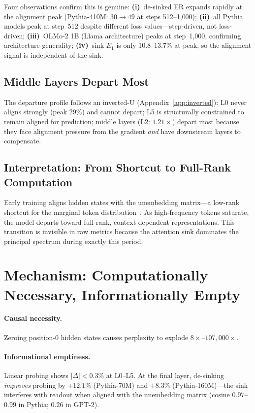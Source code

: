\documentclass[11pt]{article}
\begin{document}
Four observations confirm this is genuine:
\textbf{(i)}~de-sinked ER expands rapidly at the alignment peak (Pythia-410M: $30 \to 49$ at steps 512--1{,}000);
\textbf{(ii)}~all Pythia models peak at step~512 despite different loss values---step-driven, not loss-driven;
\textbf{(iii)}~OLMo-2 1B (Llama architecture) peaks at step~1{,}000, confirming architecture-generality;
\textbf{(iv)}~sink $E_1$ is only 10.8--13.7\% at peak, so the alignment signal is independent of the sink.

\subsection{Middle Layers Depart Most}\label{sec:inverted}

The departure profile follows an inverted-U (Appendix~\ref{app:inverted}): L0 never aligns strongly (peak 29\%) and cannot depart; L5 is structurally constrained to remain aligned for prediction; middle layers (L2: $1.21\times$) depart most because they face alignment pressure from the gradient \emph{and} have downstream layers to compensate.

\subsection{Interpretation: From Shortcut to Full-Rank Computation}\label{sec:interpret}

Early training aligns hidden states with the unembedding matrix---a low-rank shortcut for the marginal token distribution~\citep{chang2022word,cagnetta2024distributional}.
As high-frequency tokens saturate, the model departs toward full-rank, context-dependent representations.
This transition is invisible in raw metrics because the attention sink dominates the principal spectrum during exactly this period.

\section{Mechanism: Computationally Necessary, Informationally Empty}\label{sec:mechanism}

\paragraph{Causal necessity.}
Zeroing position-0 hidden states causes perplexity to explode $8\times$--$107{,}000\times$.

\paragraph{Informational emptiness.}
Linear probing shows $|\Delta| < 0.3\%$ at L0--L5.
At the final layer, de-sinking \emph{improves} probing by $+12.1\%$ (Pythia-70M) and $+8.3\%$ (Pythia-160M)---the sink interferes with readout when aligned with the unembedding matrix (cosine $0.97$--$0.99$ in Pythia; $0.26$ in GPT-2).
\end{document}
